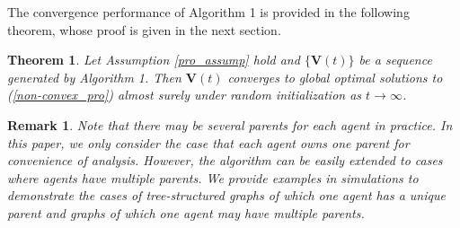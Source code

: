 \documentclass[journal]{IEEEtran}
\newtheorem{theorem}{Theorem}[section]
\newtheorem{remark}{Remark}[section]
\newtheorem{assumption}{Assumption}[section]
\begin{document}
The convergence performance of Algorithm 1 is provided in the following theorem, whose proof is given in the next section.
\begin{theorem}\label{syn_theo}
	Let Assumption \ref{pro_assump} hold and $\{\mathbf V(t)\}$ be a sequence generated by Algorithm 1. Then $\mathbf V(t)$ converges to global optimal solutions to (\ref{non-convex_pro}) almost surely under random initialization as $t\rightarrow\infty$. 
\end{theorem}
\begin{remark}
	Note that there may be several parents for each agent in practice. In this paper, we only consider the case that each agent owns one parent for convenience of analysis. However, the algorithm can be  easily extended to cases where agents have multiple parents. We  provide examples in simulations to demonstrate the cases of tree-structured graphs of which one agent has a unique parent and  graphs of which one agent may have multiple parents.	
\end{remark}
\end{document}
